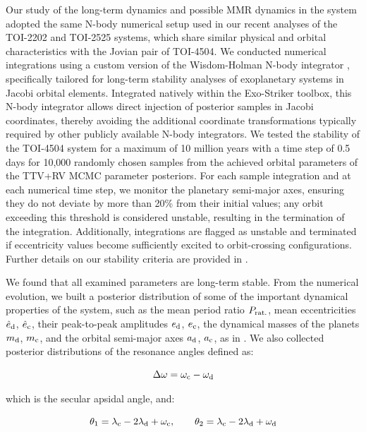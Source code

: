 \documentclass[twocolumn,twocolappendix]{aastex631}
\begin{document}
Our study of the long-term dynamics and possible MMR dynamics in the system adopted the same N-body numerical setup used in our recent analyses of the TOI-2202 \citep{TOI-2202} and TOI-2525 \citep{Trifonov2023} systems, which share similar 
physical and orbital characteristics with the Jovian pair of 
TOI-4504. We conducted numerical integrations using a custom 
version of the Wisdom-Holman N-body integrator \citep{Wisdom1991}, 
specifically tailored for long-term stability analyses of exoplanetary systems in Jacobi orbital elements. Integrated natively within the {\sc Exo-Striker} toolbox, this N-body integrator allows direct injection of posterior samples in Jacobi coordinates, thereby avoiding the additional coordinate transformations typically required by other publicly available N-body integrators.
We 
tested the stability of the TOI-4504 system for a maximum of 10 million years 
with a time step of 0.5 days for 10,000 randomly chosen samples 
from the achieved orbital parameters of the TTV+RV MCMC parameter 
posteriors. For each sample integration and at each numerical time step, we monitor the planetary semi-major axes, ensuring they do 
not deviate by more than 20\% from their initial values; any orbit 
exceeding this threshold is considered unstable, resulting in the 
termination of the integration. Additionally, integrations are flagged 
as unstable and terminated if eccentricity values become sufficiently 
excited to orbit-crossing configurations. Further details on our 
stability criteria are provided in \citet{TOI-2202}.



We found that all examined parameters are long-term stable. From the numerical evolution, we built a posterior distribution of some of the important dynamical properties of the system, such as the mean period ratio $P_{\rm rat.}$, mean eccentricities $\hat e_{\rm d}$, $\hat e_{\rm c}$, their peak-to-peak amplitudes $e_{\rm d}$, $e_{\rm c}$, the dynamical masses of the planets $m_{\rm d}$, $m_{\rm c}$, and the orbital semi-major axes $a_{\rm d}$, $a_{\rm c}$, as in \citet{wine5,Trifonov2023}. We also collected posterior distributions of the resonance angles defined as:

\begin{equation}
\Delta\omega = \omega_{\rm c} - \omega_{\rm d}
\label{eq1}
\end{equation}

\noindent
which is the secular apsidal angle, and:

\begin{equation}
\theta_1 =  \lambda_{\rm c} - 2\lambda_{\rm d} + \omega_{\rm c},~~~~~~\theta_2 =  \lambda_{\rm c} - 2\lambda_{\rm d} + \omega_{\rm d}
\label{eq2}
\end{equation}
\end{document}
